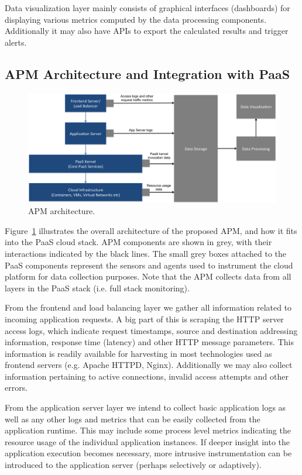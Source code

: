 \documentclass[11pt]{article}
\begin{document}
Data visualization layer mainly consists of graphical interfaces (dashboards) for displaying various
metrics computed by the data processing components. Additionally it may also have APIs to export
the calculated results and trigger alerts. 

\subsection{APM Architecture and Integration with PaaS}
\begin{figure}
\centering
\includegraphics[scale=0.35]{apm_architecture}
\caption{APM architecture.}
\label{fig:apm_architecture}
\end{figure}

Figure~\ref{fig:apm_architecture} illustrates the overall architecture of the proposed APM, and how 
it fits into the PaaS cloud stack. APM components are shown in grey, with their interactions indicated
by the black lines. The small grey boxes attached to the PaaS components represent the sensors and
agents used to instrument the cloud platform for data collection purposes. Note that the APM collects
data from all layers in the PaaS stack (i.e. full stack monitoring).

From the frontend and load balancing layer we gather all information related to incoming application
requests. A big part of this is scraping the HTTP server access logs, which indicate request timestamps,
source and destination addressing information, response time (latency) and other HTTP message
parameters. This information is readily available for harvesting in most technologies used as frontend
servers (e.g. Apache HTTPD, Nginx). Additionally we may also collect information pertaining to active
connections, invalid access attempts and other errors.

From the application server layer we intend to collect basic application logs as well as any other logs and 
metrics that can be easily collected from the application runtime. This may include some process level
metrics indicating the resource usage of the individual application instances. If deeper insight into the 
application execution becomes necessary, more intrusive instrumentation can be introduced to the 
application server (perhaps selectively or adaptively). 
\end{document}

